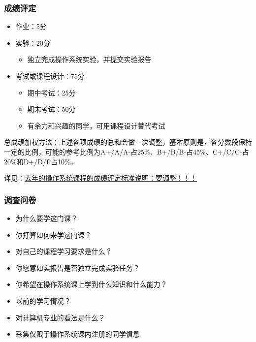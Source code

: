 \begin{frame}[fragile]
    \frametitle{成绩评定}
    \begin{itemize}
        \item 作业：5分
        \item 实验：20分
        \begin{itemize}
            \item 独立完成操作系统实验，并提交实验报告
        \end{itemize} \pause
        \item 考试或课程设计：75分
        \begin{itemize}
            \item 期中考试：25分
            \item 期末考试：50分
            \item 有余力和兴趣的同学，可用课程设计替代考试
        \end{itemize}

    \end{itemize} \pause

    总成绩加权方法：上述各项成绩的总和会做一次调整，基本原则是，各分数段保持一定的比例，可能的参考比例为A+/A/A-占25\%、B+/B/B-占45\%、C+/C/C-占20\%和D+/D/F占10\%。 
    \newline \newline
    
    详见：\href{http://os.cs.tsinghua.edu.cn/oscourse/OS2020spring/log#A20200210-.2BZM1PXHz7ft.2BL.2FnoLdoRiEH7pi8RbmmgHUcaL9GYO-}{去年的操作系统课程的成绩评定标准说明：要调整！！！}
    
\end{frame}

    
    \begin{frame}
        \frametitle{调查问卷}
        \begin{itemize}
            \item 为什么要学这门课？ \pause
            \item 你打算如何来学这门课？
            \item 对自己的课程学习要求是什么？
            \item 你愿意如实报告是否独立完成实验任务？
            \item 你希望在操作系统课上学到什么知识和什么能力？ \pause
            \item 以前的学习情况？
            \item 对计算机专业的看法是什么？ \pause
            \item 采集仅限于操作系统课内注册的同学信息
        \end{itemize}
    \end{frame}


